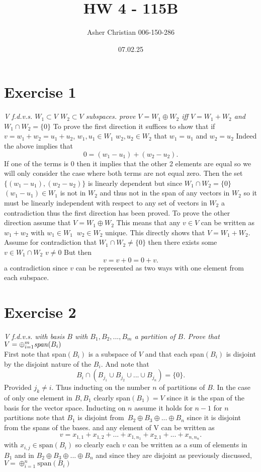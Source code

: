 \documentclass{article}
\title{HW 4 - 115B}
\author{Asher Christian 006-150-286}
\date{ 07.02.25}
\begin{document}
    \maketitle
    \section{Exercise 1}
    \emph{
        V f.d.v.s. $W_1 \subset V$ $W_2 \subset V$ subspaces. prove $V = W_1 \oplus W_2$ iff
        $V = W_1 + W_2$  and $W_1 \cap W_2 = \{0\}$
    }
    To prove the first direction it suffices to show that if $v = w_1 + w_2 = u_1 + u_2$, $w_1,u_1 \in W_1$ $w_2,u_2 \in W_2$ that $w_1 = u_1$ and $w_2 = u_2$
    Indeed the above implies that
    \[
    0 = (w_1-u_1) + (w_2-u_2)
    .\] 
    If one of the terms is $0$ then it implies that the other 2 elements are equal so we
    will only consider the case where both terms are not equal zero.
    Then the set $\{(w_1-u_1), (w_2-u_2)\}$ is linearly dependent but since $W_1 \cap W_2 = \{0\}$
    $(w_1-u_1) \in W_1$ is not in $W_2$ and thus not in the span of any vectors in $W_2$ so it must be linearly independent with
    respect to any set of vectors in $W_2$ a contradiction thus the first direction has been proved.
    To prove the other direction assume that $V = W_1 \oplus W_2$ This means that any $v \in V$ can be written as $w_1 + w_2$ with $w_1 \in W_1 \;\; w_2 \in W_2$ unique.
    This directly shows that  $V = W_1 + W_2$. Assume for contradiction that $W_1 \cap W_2 \ne \{0\}$ then there exists some $v \in W_1 \cap W_2$ $v \ne 0$
    But then
     \[
    v = v + 0 = 0 +v
    .\] 
    a contradiction since $v$ can be represented as two ways with one element from each subspace.

    \section{Exercise 2}
    \emph{
        V f.d.v.s. with basis $B$ with $B_1,B_2,...,B_m$ a partition of $B$. Prove that
        $V = \oplus_{i=1}^{m} \text{\emph{span}} (B_i)$
    }\\
    First note that span$(B_i)$ is a subspace of  $V$ and that each span$(B_i)$ is disjoint by the disjoint nature of the  $B_i$.
    And note that 
    \[
        B_i \cap (B_{j_1} \cup B_{j_2} \cup ... \cup B_{j_n}) = \{0\}
    .\] 
    Provided $j_k \ne i$. Thus inducting on the number $n$ of partitions of $B$.
    In the case of only one element in $B, B_1$ clearly span$(B_1) = V$ since it is the span of the basis for the vector space.
    Inducting on  $n$ assume it holds for $n-1$ for $n$ partitions note that $B_1$ is disjoint from\
    $B_2 \oplus B_3 \oplus ... \oplus B_n$ since it is disjoint from the spans of the bases. and any element of V 
    can be written as
    \[
        v = x_{1,1} + x_{1,2} + ... + x_{1,n_1} + x_{2,1}  + ... + x_{n,n_n}
    .\] 
    with $x_{i,j} \in \text{span}(B_i)$ so clearly each  $v$ can be written as a sum of
    elements in $B_1$ and in $B_2 \oplus B_3 \oplus ... \oplus B_n$ and since they are disjoint as previously discussed,
    $V = \oplus_{i=1}^{n}\text{span}(B_i)$
\end{document}
